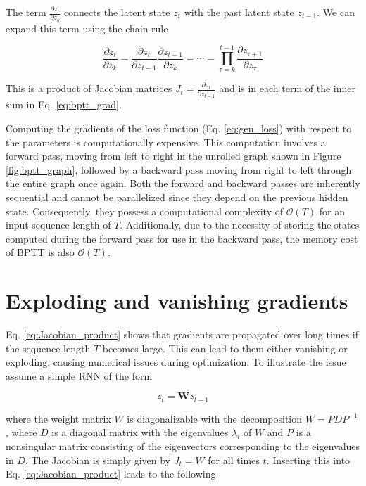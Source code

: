 The term $\frac{\partial z_{t}}{\partial z_{k}}$ connects the latent state $z_{t}$ with the past latent state $z_{t-1}$. We can expand this term using the chain rule

\begin{equation}
    \frac{\partial z_{t}}{\partial z_{k}} = \frac{\partial z_{t}}{\partial z_{t-1}} \frac{\partial z_{t-1}}{\partial z_{k}} = \cdots 
    = \prod_{\tau=k}^{t-1} \frac{\partial z_{\tau+1}}{\partial z_{\tau}}
    \label{eq:Jacobian_product}
\end{equation}

This is a product of Jacobian matrices $J_{t} = \frac{\partial z_{t}}{\partial z_{t-1}}$ and is in each term of the inner sum in Eq. \ref{eq:bptt_grad}.


Computing the gradients of the loss function (Eq. \ref{eq:gen_loss}) with respect to the parameters is computationally expensive. 
This computation involves a forward pass, moving from left to right in the unrolled graph shown in Figure \ref{fig:bptt_graph}, 
followed by a backward pass moving from right to left through the entire graph once again.
Both the forward and backward passes are inherently sequential and cannot be parallelized since they depend on the previous hidden state.
Consequently, they possess a computational complexity of $\mathcal{O}(T)$ for an input sequence length of $T$. \newline 
Additionally, due to the necessity of storing the states computed during the forward pass for use in the backward pass, 
the memory cost of BPTT is also $\mathcal{O}(T)$.



\FloatBarrier
\section{Exploding and vanishing gradients} \label{sec:evg_problem}

Eq. \ref{eq:Jacobian_product} shows that gradients are propagated over long times if the sequence length $T$ becomes large. 
This can lead to them either vanishing or exploding, causing numerical issues during optimization. To illustrate the issue assume a
simple RNN of the form 

\begin{equation}
    z_{t} = \boldsymbol{W} z_{t-1}
    \label{eq:simple_rnn}
\end{equation}

where the weight matrix $W$ is diagonalizable with the decomposition $W = P D P^{-1}$, where $D$ is a diagonal matrix with the eigenvalues $\lambda_i$
of $W$ and $P$ is a nonsingular matrix consisting of the eigenvectors corresponding to the eigenvalues in $D$. The Jacobian is simply given by $J_t = W$ 
for all times $t$. Inserting this into Eq. \ref{eq:Jacobian_product} leads to the following

